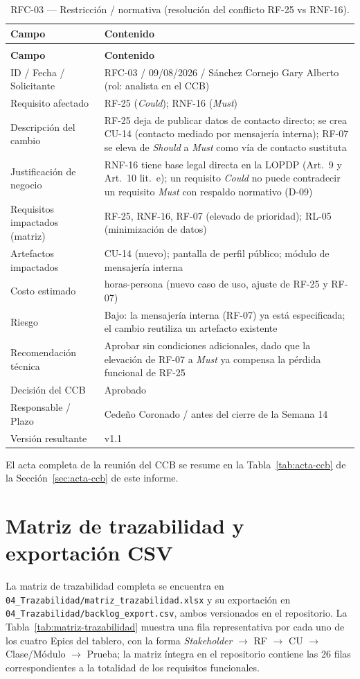 \documentclass[journal,onecolumn]{IEEEtran}
\makeatletter
\newenvironment{atributos}[2]{%
	\small
	\begin{longtable}{@{}>{\raggedright\arraybackslash}p{4.2cm} >{\raggedright\arraybackslash}p{11.2cm}@{}}
		\caption{#2}\label{tab:#1}\\
		\toprule
		\textbf{Campo} & \textbf{Contenido} \\
		\midrule
		\endfirsthead
		\multicolumn{2}{@{}l}{\small\itshape (continuación)}\\
		\toprule
		\textbf{Campo} & \textbf{Contenido} \\
		\midrule
		\endhead
		\bottomrule
		\endlastfoot
	}{%
	\end{longtable}
	\normalsize
}
\makeatother
\begin{document}
	\begin{atributos}{rfc-03}{RFC-03 --- Restricción / normativa (resolución del conflicto RF-25 vs RNF-16).}
		ID / Fecha / Solicitante & RFC-03 / 09/08/2026 / Sánchez Cornejo Gary Alberto (rol: analista en el CCB) \\
		Requisito afectado & RF-25 (\emph{Could}); RNF-16 (\emph{Must}) \\
		Descripción del cambio & RF-25 deja de publicar datos de contacto directo; se crea CU-14 (contacto mediado por mensajería interna); RF-07 se eleva de \emph{Should} a \emph{Must} como vía de contacto sustituta \\
		Justificación de negocio & RNF-16 tiene base legal directa en la LOPDP (Art.\ 9 y Art.\ 10 lit.\ e); un requisito \emph{Could} no puede contradecir un requisito \emph{Must} con respaldo normativo (D-09) \\
		Requisitos impactados (matriz) & RF-25, RNF-16, RF-07 (elevado de prioridad); RL-05 (minimización de datos) \\
		Artefactos impactados & CU-14 (nuevo); pantalla de perfil público; módulo de mensajería interna \\
		Costo estimado & 5 horas-persona (nuevo caso de uso, ajuste de RF-25 y RF-07) \\
		Riesgo & Bajo: la mensajería interna (RF-07) ya está especificada; el cambio reutiliza un artefacto existente \\
		Recomendación técnica & Aprobar sin condiciones adicionales, dado que la elevación de RF-07 a \emph{Must} ya compensa la pérdida funcional de RF-25 \\
		Decisión del CCB & Aprobado \\
		Responsable / Plazo & Cedeño Coronado / antes del cierre de la Semana 14 \\
		Versión resultante & v1.1 \\
	\end{atributos}
	
	El acta completa de la reunión del CCB se resume en la
	Tabla~\ref{tab:acta-ccb} de la Sección~\ref{sec:acta-ccb} de este
	informe.
	
	\section{Matriz de trazabilidad y exportación CSV}
	\label{ap:anexoD}
	
	La matriz de trazabilidad completa se encuentra en
	\texttt{04\_Trazabilidad/matriz\_trazabilidad.xlsx} y su
	exportación en \texttt{04\_Trazabilidad/backlog\_export.csv},
	ambos versionados en el repositorio. La Tabla~\ref{tab:matriz-trazabilidad}
	muestra una fila representativa por cada uno de los cuatro Epics
	del tablero, con la forma \emph{Stakeholder} $\rightarrow$ RF
	$\rightarrow$ CU $\rightarrow$ Clase/Módulo $\rightarrow$ Prueba;
	la matriz íntegra en el repositorio contiene las 26 filas
	correspondientes a la totalidad de los requisitos funcionales.
	
\end{document}
